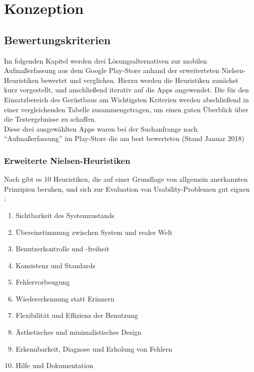 \chapter{Konzeption}

\section{Bewertungskriterien}
 
 Im folgenden Kapitel werden drei Lösungsalternativen zur mobilen Aufmaßerfassung aus dem Google Play-Store anhand der erweiterteten Nielsen-Heuristiken  bewertet und verglichen.
Hierzu werden die Heuristiken zunächst kurz vorgestellt, und anschließend iterativ auf die Apps angewendet. Die für den Einsatzbereich des Gerüstbaus am Wichtigsten Kriterien werden abschließend in einer vergleichenden Tabelle zusammengetragen, um einen guten Überblick über die Testergebnisse zu schaffen. \\

 Diese drei ausgewählten Apps waren bei der Suchanfrange nach ``Aufmaßerfassung'' im Play-Store die am best bewerteten (Stand Januar 2018)
  \\
 
 
 \subsection{Erweiterte Nielsen-Heuristiken}
 Nach \citeauthor{Nielsen:1994:UIM} gibt es 10 Heuristiken, die auf einer Grundlage von allgemein anerkannten Prinzipien beruhen, und sich zur Evaluation von Usability-Problemen gut eignen \citep[Seite.~25--62]{Nielsen:1994:UIM}: 

\begin{enumerate}
	\item \label{itm:1} Sichtbarkeit des Systemzustands
	\item \label{itm:2} Übereinstimmung zwischen System und realer Welt
	\item \label{itm:3} Benutzerkontrolle und -freiheit
	\item \label{itm:4} Konsistenz und Standards
	\item \label{itm:5} Fehlervorbeugung
	\item \label{itm:6} Wiedererkennung statt Erinnern
	\item \label{itm:7} Flexibilität und Effizienz der Benutzung
	\item \label{itm:8} Ästhetisches und minimalistisches Design
	\item \label{itm:9} Erkennbarkeit, Diagnose und Erholung von Fehlern
	\item \label{itm:10} Hilfe und Dokumentation
\end{enumerate} 

